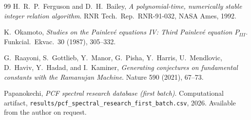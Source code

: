 \documentclass[12pt]{amsart}
\theoremstyle{definition}
\begin{document}
\begin{thebibliography}{99}
H.~R.~P.~Ferguson and D.~H.~Bailey, \emph{A polynomial-time, numerically
stable integer relation algorithm}. RNR Tech.\ Rep.\ RNR-91-032, NASA
Ames, 1992.

K.~Okamoto, \emph{Studies on the Painlev\'e equations IV: Third
Painlev\'e equation $P_{III}$}. Funkcial.\ Ekvac.~30 (1987), 305--332.

G.~Raayoni, S.~Gottlieb, Y.~Manor, G.~Pisha, Y.~Harris, U.~Mendlovic,
D.~Haviv, Y.~Hadad, and I.~Kaminer, \emph{Generating conjectures on
fundamental constants with the Ramanujan Machine}.
Nature 590 (2021), 67--73.

Papanokechi, \emph{PCF spectral research database (first batch)}.
Computational artifact,
\texttt{results/pcf\_spectral\_research\_first\_batch.csv}, 2026.
Available from the author on request.

\end{thebibliography}
\end{document}

